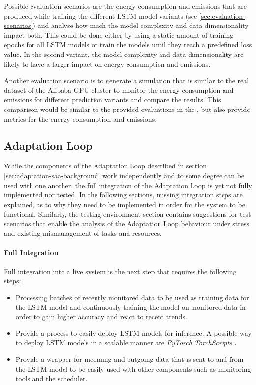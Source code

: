             Possible evaluation scenarios are the energy consumption and \COTWO emissions that are produced while training the different LSTM model variants (see \ref{sec:evaluation-scenarios}) and analyse how much the model complexity and data dimensionality impact both. 
            This could be done either by using a static amount of training epochs for all LSTM models or train the models until they reach a predefined loss value. In the second variant, the model complexity and data dimensionality are likely to have a larger impact on energy consumption and \COTWO emissions.

            Another evaluation scenario is to generate a simulation that is similar to the real dataset of the Alibaba GPU cluster to monitor the energy consumption and \COTWO emissions for different prediction variants and compare the results.
            This comparison would be similar to the provided evaluations in the , but also provide metrics for the energy consumption and \COTWO emissions.

        \subsection{Adaptation Loop}
        \label{sec:adaptation-loop-future-work}

            While the components of the Adaptation Loop described in section \ref{sec:adaptation-saa-background} work independently and to some degree can be used with one another, the full integration of the Adaptation Loop is yet not fully implemented nor tested.
            In the following sections, missing integration steps are explained, as to why they need to be implemented in order for the system to be functional.
            Similarly, the testing environment section contains suggestions for test scenarios that enable the analysis of the Adaptation Loop behaviour under stress and existing mismanagement of tasks and resources.

            \paragraph{Full Integration}
            Full integration into a live system is the next step that requires the following steps:
            \begin{itemize}
                \item Processing batches of recently monitored data to be used as training data for the LSTM model and continuously training the model on monitored data in order to gain higher accuracy and react to recent trends.
                \item Provide a process to easily deploy LSTM models for inference. A possible way to deploy LSTM models in a scalable manner are \emph{PyTorch TorchScripts} \cite{inkawhichSavingLoadingModels}.
                \item Provide a wrapper for incoming and outgoing data that is sent to and from the LSTM model to be easily used with other components such as monitoring tools and the \CMATCH scheduler.
            \end{itemize}

